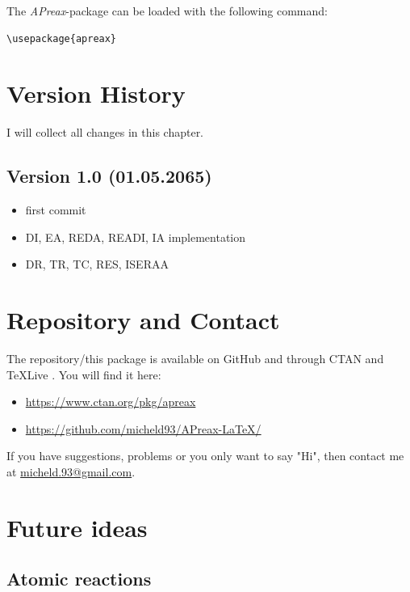 \documentclass[
	a4paper,
	parskip=half,
    pagesize=auto,      		%
    listof=totoc,   		%
    bibliography=totoc,
	11pt
]{scrartcl}
\begin{document}
The \textit{APreax}-package can be loaded with the following command: 

\begin{lstlisting}
\usepackage{apreax}
\end{lstlisting}


\section{Version History}

I will collect all changes in this chapter. 

\subsection{Version 1.0 (01.05.2065)}

\begin{itemize}
    \item first commit
    \item DI, EA, REDA, READI, IA implementation
    \item DR, TR, TC, RES, ISERAA
\end{itemize}

\section{Repository and Contact}

The repository/this package is available on GitHub and through CTAN \cite{ctan} and TeXLive \cite{texlive}. You will find it here:


\begin{itemize}
    \item \url{https://www.ctan.org/pkg/apreax}
    \item \url{https://github.com/micheld93/APreax-LaTeX/}  
\end{itemize}


If you have suggestions, problems or you only want to say "Hi", then contact me at \href{mailto:micheld.93@ gmail.com}{micheld.93@gmail.com}.


\section{Future ideas}

\subsection{Atomic reactions}
\end{document}
